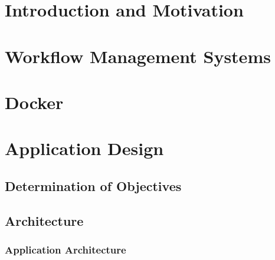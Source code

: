 \documentclass[language=english,noinputenc]{wiwwuwordrprt}
\begin{document}
  \EinfTitelseite

  \tableofcontents
  \listoffigures
  \listoftables

  

  \clearpage
  


  \chapter{Introduction and Motivation} %
    \label{cha:introduction_and_motivation}
    

  \chapter{Workflow Management Systems} %
    \label{cha:workflow_management_systems}
    

  \chapter{Docker} %
    \label{cha:docker}
      

  \chapter{Application Design} %
    \label{cha:solution_design}

    \section{Determination of Objectives} %
      \label{sec:determination_of_objectives}
      

    \section{Architecture} %
    \label{sec:architecture}
      \subsection{Application Architecture} %
      \label{sub:application_architecture}
\end{document}
